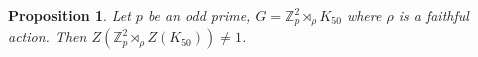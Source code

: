 \documentclass[a4paper, english, 9pt]{amsart}
\theoremstyle{plain}
\newtheorem{lemma}[theorem]{Lemma}
\newtheorem{proposition}[theorem]{Proposition}
\theoremstyle{definition}
\def\comment#1{{\color{red} #1}}
\def\Z{\mathbb Z}
\begin{document}






\begin{proposition}\label{no rep}
    Let $p$ be an odd prime, $G=\Z_p^2\rtimes_\rho K_{50}$ where $\rho$ is a faithful action. Then $Z(\Z_p^2\rtimes_\rho Z(K_{50}))\neq 1$.
\end{proposition}
\end{document}
